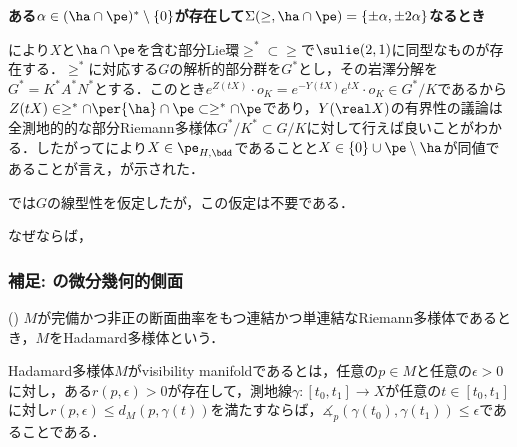 \begin{npfwn}[\Cref{thm:1216-main}]


  
  \textbf{ある$\alpha\in (\ha\cap\pe)^{*}\setminus\{0\} $が存在して$\Sigma(\ge,\ha\cap\pe) = \{\pm\alpha,\pm 2\alpha \}$なるとき}

  により$X$と$\ha \cap\pe$を含む部分Lie環$\ge^* \subset \ge $で$\sulie(2,1) $に同型なものが存在する．$\ge^* $に対応する$G$の解析的部分群を$G^* $とし，その岩澤分解を$G^* = K^*A^*N^* $とする．このとき$e^{Z(t X)}\cdot o_K = e^{-Y(tX)}e^{tX}\cdot o_K\in G^*/K $であるから$Z(tX)\in \ge^* \cap \per{\ha}\cap \pe\subset \ge^*\cap\pe $であり，$Y(\real X) $の有界性の議論は全測地的的な部分Riemann多様体$G^*/K^* \subset G/K$に対して行えば良いことがわかる．したがってにより$X\in\pe_{H,\bdd}$であることと$ X \in\{0\}\cup \pe\setminus\ha $が同値であることが言え，が示された．
\end{npfwn}

    
\begin{rem}
  では$G$の線型性を仮定したが，この仮定は不要である．

  なぜならば，
\end{rem}


\subsubsection{補足: の微分幾何的側面}
\begin{defi}({\cite[Definition~1.3]{e72-1}})\label{def:visibility}
  $M$が完備かつ非正の断面曲率をもつ連結かつ単連結なRiemann多様体であるとき，$M$をHadamard多様体という．

  Hadamard多様体$M$がvisibility manifoldであるとは，任意の$ p\in M$と任意の$ \epsilon > 0$に対し，ある$r(p,\epsilon) >0 $が存在して，測地線$\gamma\colon [t_0, t_1]\to X $が任意の$ t\in [t_0, t_1]$に対し$r(p,\epsilon) \leq d_{M}(p, \gamma(t))$を満たすならば，$\measuredangle_{p}(\gamma(t_0), \gamma(t_1)) \leq \epsilon $であることである．
\end{defi}

